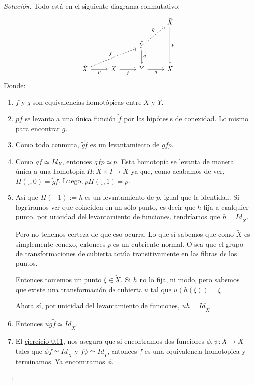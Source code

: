 \documentclass[spanish]{book}
\theoremstyle{definition}
\begin{document}
\begin{proof}[Solución]
	Todo está en el siguiente diagrama conmutativo:
	\[\begin{tikzcd}
		&&&\tilde{X}\arrow[dd,"p"]\\
		&&\tilde{Y}\arrow[d,"q"]\arrow[ru,dashed,"\tilde{g}"]\\
		\tilde{X}\arrow[rru,dashed,"\tilde{f}"]\arrow[r,swap,"p"]&X\arrow[r,swap,"f"]&Y\arrow[r,swap,"g"]&X
	\end{tikzcd}\]
	Donde:
	\begin{enumerate}
		\item $f$ y $g$ son equivalencias homotópicas entre $X$ y $Y$.
		\item $pf$ se levanta a una única función $\tilde{f}$ por las hipótesis de conexidad. Lo mismo para encontrar $\tilde{g}$.
		\item Como todo conmuta, $\tilde{g}\tilde{f}$ es un levantamiento de $gfp$.
		\item Como $gf\simeq Id_X$, entonces $gfp\simeq p$. Esta homotopía se levanta de manera única a una homotopía $H:\tilde{X}\times I\to\tilde{X}$ ya que, como acabamos de ver, $H(\underline{\hspace{5pt}},0)=\tilde{g}\tilde{f}$. Luego, $pH(\underline{\hspace{5pt}},1)=p$.
		\item Así que $H(\underline{\hspace{5pt}},1):=h$ es un levantamiento de $p$, igual que la identidad. Si lográramos ver que coinciden en un sólo punto, es decir que $h$ fija a cualquier punto, por unicidad del levantamiento de funciones, tendríamos que $h=Id_{\tilde{X}}$.
		
		Pero no tenemos certeza de que eso ocurra. Lo que sí sabemos que como $\tilde{X}$ es simplemente conexo, entonces $p$ es un cubriente normal. O sea que el grupo de transformaciones de cubierta actúa transitivamente en las fibras de los puntos.
		
		Entonces tomemos un punto $\xi\in\tilde{X}$. Si $h$ no lo fija, ni modo, pero sabemos que existe una transformación de cubierta $u$ tal que $u(h(\xi))=\xi$.
		
		Ahora sí, por unicidad del levantamiento de funciones, $uh= Id_{\tilde{X}}$.
		\item Entonces $u\tilde{g}\tilde{f}\simeq Id_{\tilde{X}}$.
		\item El \hyperref[hatcher:0.11]{ ejercicio 0.11}, nos asegura que si encontramos dos funciones $\phi,\psi:\tilde{X}\to\tilde{X}$ tales que $\phi\tilde{f}\simeq Id_{\tilde{X}}$ y $\tilde{f}\psi\simeq Id_{\tilde{Y}}$, entonces $\tilde{f}$ es una equivalencia homotópica y terminamos. Ya encomtramos $\phi$.
		

\end{enumerate}
\end{proof}
\end{document}
